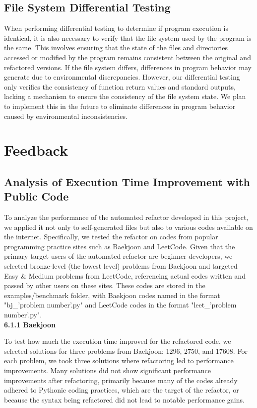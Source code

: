 \documentclass[11pt]{article}
\begin{document}
\subsection{File System Differential Testing}
When performing differential testing to determine if program execution is identical, it is also necessary to verify that the file system used by the program is the same. This involves ensuring that the state of the files and directories accessed or modified by the program remains consistent between the original and refactored versions. If the file system differs, differences in program behavior may generate due to environmental discrepancies. However, our differential testing only verifies the consistency of function return values and standard outputs, lacking a mechanism to ensure the consistency of the file system state. We plan to implement this in the future to eliminate differences in program behavior caused by environmental inconsistencies.

\section{Feedback}
\subsection{Analysis of Execution Time Improvement with Public Code}
To analyze the performance of the automated refactor developed in this project, we applied it not only to self-generated files but also to various codes available on the internet. Specifically, we tested the refactor on codes from popular programming practice sites such as Baekjoon and LeetCode. Given that the primary target users of the automated refactor are beginner developers, we selected bronze-level (the lowest level) problems from Baekjoon and targeted Easy \& Medium problems from LeetCode, referencing actual codes written and passed by other users on these sites. These codes are stored in the examples/benchmark folder, with Baekjoon codes named in the format "bj\_'problem number'.py" and LeetCode codes in the format "leet\_'problem number'.py".\\

\textbf{6.1.1 Baekjoon}

To test how much the execution time improved for the refactored code, we selected solutions for three problems from Baekjoon: 1296, 2750, and 17608. For each problem, we took three solutions where refactoring led to performance improvements. Many solutions did not show significant performance improvements after refactoring, primarily because many of the codes already adhered to Pythonic coding practices, which are the target of the refactor, or because the syntax being refactored did not lead to notable performance gains.\\
\end{document}
